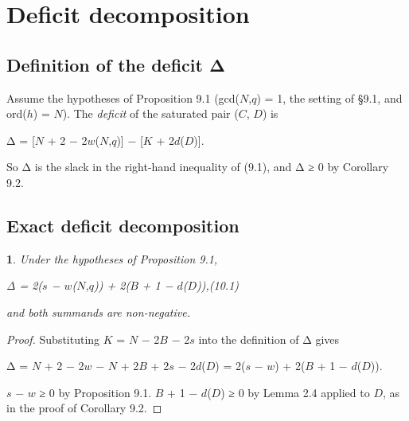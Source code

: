 \documentclass[pdflatex,sn-mathphys-num]{sn-jnl}
\theoremstyle{thmstyleone}
\newcommand{\thmxname}{}
\newtheorem*{thmxinner}{\thmxname}
\newenvironment{thmx}[1]{\renewcommand{\thmxname}{#1}\begin{thmxinner}}{\end{thmxinner}}
\theoremstyle{thmstylethree}
\begin{document}
\section{Deficit decomposition}

\subsection{Definition of the deficit Δ}

Assume the hypotheses of Proposition 9.1 (gcd(\(N\),\(q\)) = 1, the setting of §9.1, and ord(\(h\)) = \(N\)). The \emph{deficit} of the saturated pair (\(C\), \(D\)) is

\begin{center}Δ = {[}\(N\) + 2 − 2\(w\)(\(N\),\(q\)){]} − {[}\(K\) + 2\(d\)(\(D\)){]}.\end{center}

So Δ is the slack in the right-hand inequality of (9.1), and Δ ≥ 0 by Corollary 9.2.

\subsection{Exact deficit decomposition}

\begin{thmx}{Proposition 10.1 (deficit decomposition)}

Under the hypotheses of Proposition 9.1,

\begin{center}Δ = 2(\(s\) − \(w\)(\(N\),\(q\))) + 2(\(B\) + 1 − \(d\)(\(D\))),\qquad (10.1)\end{center}

and both summands are non-negative.

\end{thmx}

\begin{proof}[Proof]

Substituting \(K\) = \(N\) − 2\(B\) − 2\(s\) into the definition of Δ gives

\begin{center}Δ = \(N\) + 2 − 2\(w\) − \(N\) + 2\(B\) + 2\(s\) − 2\(d\)(\(D\)) = 2(\(s\) − \(w\)) + 2(\(B\) + 1 − \(d\)(\(D\))).\end{center}

\(s\) − \(w\) ≥ 0 by Proposition 9.1. \(B\) + 1 − \(d\)(\(D\)) ≥ 0 by Lemma 2.4 applied to \(D\), as in the proof of Corollary 9.2.

\end{proof}
\end{document}
